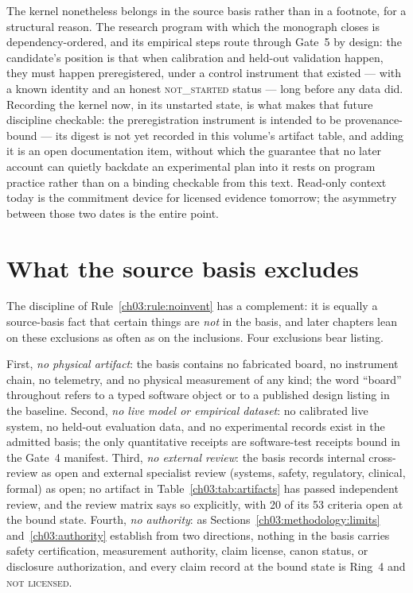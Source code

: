 The kernel nonetheless belongs in the source basis rather than in a
footnote, for a structural reason. The research program with which the
monograph closes is dependency-ordered, and its empirical steps route
through Gate~5 by design: the candidate's position is that when
calibration and held-out validation happen, they must happen
preregistered, under a control instrument that existed --- with a known
identity and an honest \textsc{not\_started} status --- long before any
data did. Recording the kernel now, in its unstarted state, is what
makes that future discipline checkable: the preregistration instrument
is intended to be provenance-bound --- its digest is not yet recorded in
this volume's artifact table, and adding it is an open documentation
item, without which the guarantee that no later account can quietly
backdate an experimental plan into it rests on program practice rather
than on a binding checkable from this text. Read-only context today is the
commitment device for licensed evidence tomorrow; the asymmetry between
those two dates is the entire point.

\section{What the source basis excludes}\label{ch03:exclusions}

The discipline of Rule~\ref{ch03:rule:noinvent} has a complement: it is
equally a source-basis fact that certain things are \emph{not} in the
basis, and later chapters lean on these exclusions as often as on the
inclusions. Four exclusions bear listing.

First, \emph{no physical artifact}: the basis contains no fabricated
board, no instrument chain, no telemetry, and no physical measurement
of any kind; the word ``board'' throughout refers to a typed software
object or to a published design listing in the baseline. Second,
\emph{no live model or empirical dataset}: no calibrated live system,
no held-out evaluation data, and no experimental records exist in the
admitted basis; the only quantitative receipts are software-test
receipts bound in the Gate~4 manifest. Third, \emph{no external
review}: the basis records internal cross-review as open and external
specialist review (systems, safety, regulatory, clinical, formal) as
open; no artifact in Table~\ref{ch03:tab:artifacts} has passed
independent review, and the review matrix says so explicitly, with 20
of its 53 criteria open at the bound state. Fourth, \emph{no
authority}: as Sections~\ref{ch03:methodology:limits}
and~\ref{ch03:authority} establish from two directions, nothing in the
basis carries safety certification, measurement authority, claim
license, canon status, or disclosure authorization, and every claim
record at the bound state is Ring~4 and \textsc{not licensed}.

